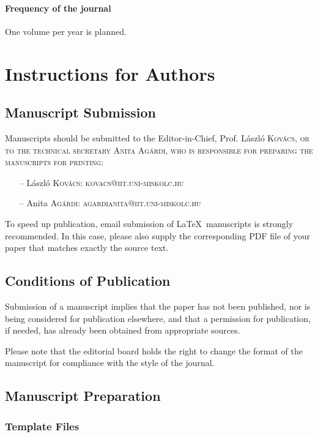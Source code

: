 \documentclass{PSAIE}%
\begin{document}
\paragraph{Frequency of the journal} One volume per year is planned.

\section{Instructions for Authors}

\subsection{Manuscript Submission}

\noindent Manuscripts should be submitted to the Editor-in-Chief,
Prof. L\'aszl\'o \scshape{Kov\'acs}\upshape, or to the technical secretary Anita Ag\'ardi, who is responsible for preparing the manuscripts for printing:
\begin{itemize}
\item[--] L\'aszl\'o \scshape{Kov\'acs}\upshape :
kovacs@iit.uni-miskolc.hu 
\item[--] Anita
\scshape{Ag\'ardi}\upshape : agardianita@iit.uni-miskolc.hu
\end{itemize}
To speed up publication, email submission of \LaTeX\ manuscripts
is strongly recommended. In this case, please also supply the
corresponding PDF file of your paper that matches exactly the
source text.

\subsection{Conditions of Publication}

\noindent Submission of a manuscript implies that the paper has
not been published, nor is being considered for publication
elsewhere, and that a permission for publication, if needed, has
already been obtained from appropriate sources.

\noindent Please note that the editorial board holds the right to
change the format of the manuscript for compliance with the style
of the journal.

\subsection{Manuscript Preparation}

\subsubsection{Template Files}
\end{document}
